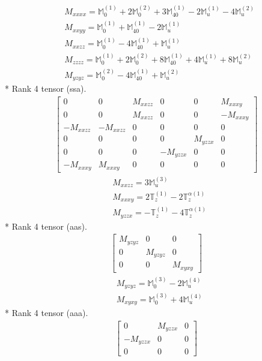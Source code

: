 \documentclass[fleqn,8pt,landscape]{jsarticle}
\begin{document}
\begin{align*}
& M_{xxxx} = \mathbb{M}_{0}^{(1)} + 2 \mathbb{M}_{0}^{(2)} + 3 \mathbb{M}_{40}^{(1)} - 2 \mathbb{M}_{u}^{(1)} - 4 \mathbb{M}_{u}^{(2)} \\
& M_{xxyy} = \mathbb{M}_{0}^{(1)} + \mathbb{M}_{40}^{(1)} - 2 \mathbb{M}_{u}^{(1)} \\
& M_{xxzz} = \mathbb{M}_{0}^{(1)} - 4 \mathbb{M}_{40}^{(1)} + \mathbb{M}_{u}^{(1)} \\
& M_{zzzz} = \mathbb{M}_{0}^{(1)} + 2 \mathbb{M}_{0}^{(2)} + 8 \mathbb{M}_{40}^{(1)} + 4 \mathbb{M}_{u}^{(1)} + 8 \mathbb{M}_{u}^{(2)} \\
& M_{yzyz} = \mathbb{M}_{0}^{(2)} - 4 \mathbb{M}_{40}^{(1)} + \mathbb{M}_{u}^{(2)}
\end{align*}
* Rank 4 tensor (ssa).
\begin{align*}
\begin{bmatrix} 0 & 0 & M_{xxzz} & 0 & 0 & M_{xxxy} \\ 0 & 0 & M_{xxzz} & 0 & 0 & - M_{xxxy} \\ - M_{xxzz} & - M_{xxzz} & 0 & 0 & 0 & 0 \\ 0 & 0 & 0 & 0 & M_{yzzx} & 0 \\ 0 & 0 & 0 & - M_{yzzx} & 0 & 0 \\ - M_{xxxy} & M_{xxxy} & 0 & 0 & 0 & 0 \end{bmatrix}
\end{align*}
\begin{align*}
& M_{xxzz} = 3 \mathbb{M}_{u}^{(3)} \\
& M_{xxxy} = 2 \mathbb{T}_{z}^{(1)} - 2 \mathbb{T}_{z}^{\alpha(1)} \\
& M_{yzzx} = - \mathbb{T}_{z}^{(1)} - 4 \mathbb{T}_{z}^{\alpha(1)}
\end{align*}
* Rank 4 tensor (aas).
\begin{align*}
\begin{bmatrix} M_{yzyz} & 0 & 0 \\ 0 & M_{yzyz} & 0 \\ 0 & 0 & M_{xyxy} \end{bmatrix}
\end{align*}
\begin{align*}
& M_{yzyz} = \mathbb{M}_{0}^{(3)} - 2 \mathbb{M}_{u}^{(4)} \\
& M_{xyxy} = \mathbb{M}_{0}^{(3)} + 4 \mathbb{M}_{u}^{(4)}
\end{align*}
* Rank 4 tensor (aaa).
\begin{align*}
\begin{bmatrix} 0 & M_{yzzx} & 0 \\ - M_{yzzx} & 0 & 0 \\ 0 & 0 & 0 \end{bmatrix}
\end{align*}
\end{document}

